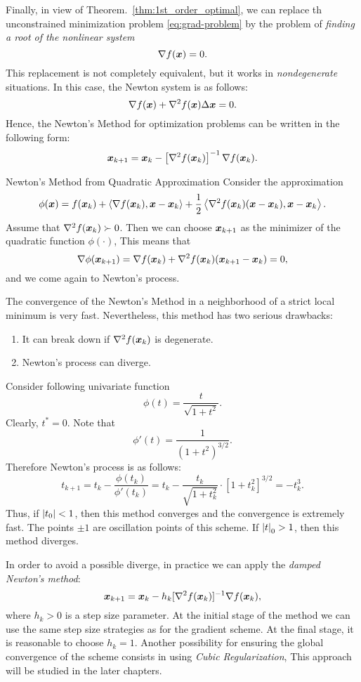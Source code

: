 Finally, in view of Theorem.~\ref{thm:1st_order_optimal}, we can replace th unconstrained minimization problem \ref{eq:grad-problem} by the problem of \emph{finding a root of the
nonlinear system}
\[
    \nabla f(\bm{x}) = 0.  
\]
This replacement is not completely equivalent, but it works in \emph{nondegenerate} situations. 
In this case, the Newton system is as follows:
\[
    \grad f(\xB) + \hess f(\xB) \Delta \xB = 0.  
\]
Hence, the Newton's Method for optimization problems can be written in the following form:
\[
    \xB_{k+1} = \xB_{k} - \left[\hess f(\xB_k)\right]^{-1} \grad f(\xB_k). 
\]

\begin{boxnote}{Newton's Method from Quadratic Approximation}
    Consider the approximation
    \[
        \phi(\xB) = f(\xB_k) + \innerprod{\grad f(\xB_k)}{\xB - \xB_k} + \frac{1}{2} \innerprod{\hess f(\xB_k)(\xB - \xB_k)}{\xB - \xB_k}.
    \]
    Assume that \(\hess f(\xB_k) \succ 0\). Then we can choose \(\bm{x}_{k+1}\) as the minimizer of the quadratic function \(\phi(\cdot)\), This means that
    \[
        \grad \phi(\xB_{k+1}) = \grad f(\xB_k) + \hess f(\xB_k) (\xB_{k+1} - \xB_k) = 0,  
    \]
    and we come again to Newton's process.
\end{boxnote}

The convergence of the Newton's Method in a neighborhood of a strict local minimum is very fast. Nevertheless, this method has two serious drawbacks:
\begin{enumerate}
    \item It can break down if \(\hess f(\xB_k)\) is degenerate.
    \item Newton's process can diverge.
\end{enumerate}

\begin{example}
    Consider following univariate function
    \[
        \phi(t) = \frac{t}{\sqrt{1 + t^2}}.  
    \]
    Clearly, \(t^* = 0\). Note that 
    \[
        \phi'(t) = \frac{1}{(1 + t^2)^{3/2}}.  
    \]
    Therefore Newton's process is as follows:
    \[
        t_{k+1} = t_k - \frac{\phi(t_k)}{\phi'(t_k)} = t_k - \frac{t_k}{\sqrt{1 + t_k^2}} \cdot [1 + t_k^2]^{3/2} = -t_k^3. 
    \]
    Thus, if \(\abs{t_0} < 1\), then this method converges and the convergence is extremely fast. The points \(\pm 1\) are oscillation points of this scheme.
    If \(\abs{t}_0 > 1\), then this method diverges.
\end{example}

In order to avoid a possible diverge, in practice we can apply the \emph{damped Newton's method}:
\[
    \xB_{k+1} = \xB_k - h_k [\hess f(\xB_k)]^{-1} \grad f(\xB_k),  
\]
where \(h_k > 0\) is a step size parameter. At the initial stage of the method we can use the same step size strategies as for the gradient scheme. At the final stage, 
it is reasonable to choose \(h_k = 1\). Another possibility for ensuring the global convergence of the scheme consists in using \emph{Cubic Regularization}, This approach will
be studied in the later chapters.

